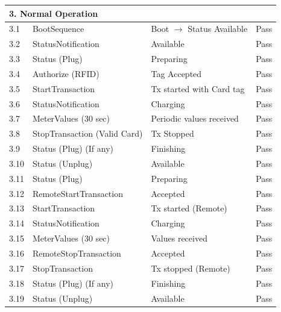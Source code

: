 \documentclass[a4paper,11pt]{report}
\begin{document}
\begin{footnotesize}
\begin{footnotesize}
\begin{longtable}{|p{1.0cm}|p{4.5cm}|p{6.5cm}|c|}
\multicolumn{4}{|l|}{\textbf{3. Normal Operation}} \\
\hline
3.1 & BootSequence & Boot $\to$ Status Available & Pass \\
\hline
3.2 & StatusNotification & Available & Pass \\
\hline
3.3 & Status (Plug) & Preparing & Pass \\
\hline
3.4 & Authorize (RFID) & Tag Accepted & Pass \\
\hline
3.5 & StartTransaction & Tx started with Card tag & Pass \\
\hline
3.6 & StatusNotification & Charging & Pass \\
\hline
3.7 & MeterValues (30 sec) & Periodic values received & Pass \\
\hline
3.8 & StopTransaction (Valid Card) & Tx Stopped & Pass \\
\hline
3.9 & Status (Plug) (If any) & Finishing & Pass \\
\hline
3.10 & Status (Unplug) & Available & Pass \\
\hline
3.11 & Status (Plug) & Preparing & Pass \\
\hline
3.12 & RemoteStartTransaction & Accepted & Pass \\
\hline
3.13 & StartTransaction & Tx started (Remote) & Pass \\
\hline
3.14 & StatusNotification & Charging & Pass \\
\hline
3.15 & MeterValues (30 sec) & Values received & Pass \\
\hline
3.16 & RemoteStopTransaction & Accepted & Pass \\
\hline
3.17 & StopTransaction & Tx stopped (Remote) & Pass \\
\hline
3.18 & Status (Plug) (If any) & Finishing & Pass \\
\hline
3.19 & Status (Unplug) & Available & Pass \\
\hline


\end{longtable}
\end{footnotesize}
\end{footnotesize}
\end{document}
